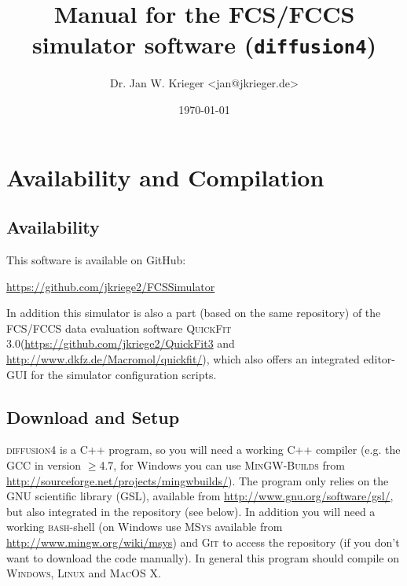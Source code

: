 \documentclass[a4paper,twoside,10pt]{report}
\newcommand{\df}{\textsc{diffusion4}\xspace}
\newcommand{\qf}{\textsc{QuickFit 3.0}\xspace}
\newcommand{\bash}{\textsc{bash}\xspace}
\newcommand{\msys}{\textsc{MSys}\xspace}
\begin{document}
\pagestyle{empty} %

\title{Manual for the FCS/FCCS simulator software (\texttt{diffusion4})}
\author{Dr. Jan W. Krieger <jan@jkrieger.de>}
\date{\today} %
\maketitle

\tableofcontents %
\cleardoublepage %

\pagestyle{plain} %

\chapter{Availability and Compilation}
\label{sec:availability_compilation}
\section{Availability}
\label{sec:Availability}
This software is available on GitHub:
\begin{center}
	\url{https://github.com/jkriege2/FCSSimulator}
\end{center}
In addition this simulator is also a part (based on the same repository) of the FCS/FCCS data evaluation software \qf (\url{https://github.com/jkriege2/QuickFit3} and \url{http://www.dkfz.de/Macromol/quickfit/}), which also offers an integrated editor-GUI for the simulator configuration scripts.

\section{Download and Setup}
\label{sec:DownloadAndSetup}
\df is a C++ program, so you will need a working C++ compiler (e.g. the \textsc{GCC} in version $\geq$4.7, for Windows you can use \textsc{MinGW-Builds} from \url{http://sourceforge.net/projects/mingwbuilds/}). The program only relies on the GNU scientific library (GSL), available from \url{http://www.gnu.org/software/gsl/}, but also integrated in the repository (see below). In addition you will need a working \bash-shell (on Windows use \msys available from \url{http://www.mingw.org/wiki/msys}) and \textsc{Git} to access the repository (if you don't want to download the code manually). In general this program should compile on \textsc{Windows}, \textsc{Linux} and \textsc{MacOS X}.\\[10mm]
\end{document}
